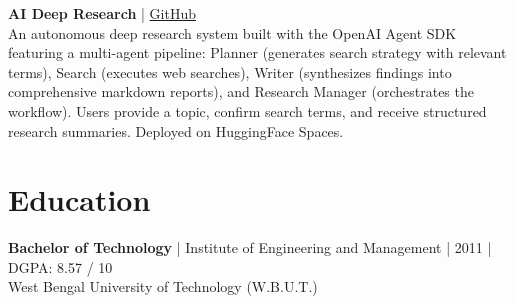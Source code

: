 \documentclass[a4paper,11pt]{article}
\begin{document}
\vspace{6pt}
\textbf{AI Deep Research} | \href{https://github.com/Vijay2351989/ai-deep-research}{GitHub} \\
An autonomous deep research system built with the OpenAI Agent SDK featuring a multi-agent pipeline: Planner (generates search strategy with relevant terms), Search (executes web searches), Writer (synthesizes findings into comprehensive markdown reports), and Research Manager (orchestrates the workflow). Users provide a topic, confirm search terms, and receive structured research summaries. Deployed on HuggingFace Spaces.

\section{Education}

\textbf{Bachelor of Technology} | Institute of Engineering and Management | 2011 | DGPA: 8.57 / 10 \\
West Bengal University of Technology (W.B.U.T.)
\end{document}
